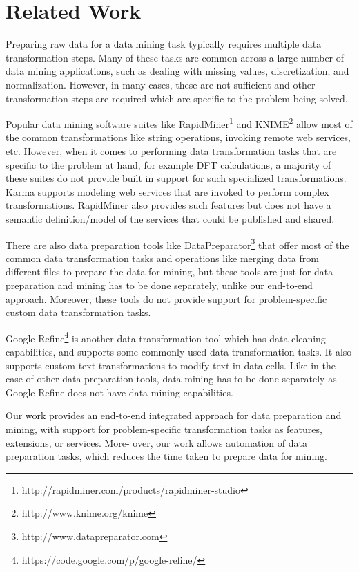 \section{Related Work}

Preparing raw data for a data mining task typically requires multiple data transformation steps\cite{Fayyad:1996:DMK:257938.257942}. Many of these tasks are common across a large number of data mining applications, such as dealing with missing values, discretization, and normalization. However, in many cases, these are not sufficient and other transformation steps are required which are specific to the problem being solved.

Popular data mining software suites like RapidMiner\footnote{http://rapidminer.com/products/rapidminer-studio} and KNIME\footnote{http://www.knime.org/knime} allow most of the common transformations like string operations, invoking remote web services, etc. However, when it comes to performing data transformation tasks that are specific to the problem at hand, for example DFT calculations, a majority of these suites do not provide built in support for such specialized transformations. Karma supports modeling web services that are invoked to perform complex transformations. RapidMiner also provides such features but does not have a semantic definition/model of the services that could be published and shared. 

There are also data preparation tools like DataPreparator\footnote{http://www.datapreparator.com} that offer most of the common data transformation tasks and operations like merging data from different files to prepare the data for mining, but these tools are just for data preparation and mining has to be done separately, unlike our end-to-end approach. Moreover, these tools do not provide support for problem-specific custom data transformation tasks.

Google Refine\footnote{https://code.google.com/p/google-refine/} is another data transformation tool which has data cleaning capabilities, and supports some commonly used data transformation tasks. It also supports custom text transformations to modify text in data cells. Like in the case of other data preparation tools, data mining has to be done separately as Google Refine does not have data mining capabilities.

Our work provides an end-to-end integrated approach for data preparation and mining, with support for problem-specific transformation tasks as features, extensions, or services. More- over, our work allows automation of data preparation tasks, which reduces the time taken to prepare data for mining.